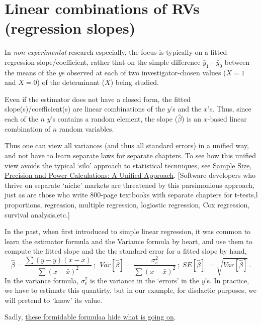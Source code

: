 \documentclass[]{book}
\begin{document}
\hypertarget{linear-combinations-of-rvs-regression-slopes}{%
\section{Linear combinations of RVs (regression slopes)}\label{linear-combinations-of-rvs-regression-slopes}}

In \emph{non-experimental} research especially, the focus is typically on a fitted regression slope/coefficient, rather that on the simple difference
\(\bar{y}_1\) - \(\bar{y}_0\) between the means of the \(y\)s observed at each of two investigator-chosen values (\(X=1\) and \(X=0\)) of the determinant (\(X\)) being studied.

Even if the estimator does not have a closed form, the fitted slope(s)/coefficient(s) are linear combinations of the \(y\)'s and the \(x\)'s. Thus, since each of the \(n\) \(y\)'s contains a random element, the slope (\(\hat{\beta}\)) is an \(x\)-based linear combination of \(n\) random variables.

Thus one can view all variances (and thus all standard errors) in a unified way, and not have to learn separate laws for separate chapters. To see how this unified view avoids the typical `silo' approach to statistical tecnniques, see \href{http://www.medicine.mcgill.ca/epidemiology/hanley/Reprints/UniversalSampleSize.pdf}{Sample Size, Precision and Power Calculations: A Unified Approach}. {[}Software developers who thrive on separate `niche' markets are threatened by this parsimonious approach, just as are those who write 800-page textbooks with separate chapters for t-tests,l proportions, regression, multiple regression, logiostic regression, Cox regression, survival analysis,etc.{]}

In the past, when first introduced to simple linear regression, it was common to learn the estimator formula and the Variance formula by heart, and use them to compute the fitted slope and the the standard error for a fitted slope by hand,
\[\hat{\beta} = \frac{\sum (y-\bar{y})(x-\bar{x})}{ \sum (x-\bar{x})^2} \ ; \ \ Var[ \hat{\beta} ] = \frac{\sigma_e^2}{ \sum (x-\bar{x})^2} \ ; \ SE[ \hat{\beta} ] \ = \sqrt{Var[ \hat{\beta} ]} \ .\]
In the variance formula, \(\sigma_e^2\) is the variance in the `errors' in the \(y\)'s. In practice, we have to estimate this quantirty, but in our example, for disdactic purposes, we will pretend to `know' its value.

Sadly, \href{http://www.medicine.mcgill.ca/epidemiology/hanley/Reprints/SimpleMultipleLinearRegressionSampleSize.pdf}{these formidable formulaa hide what is going on}.
\end{document}
